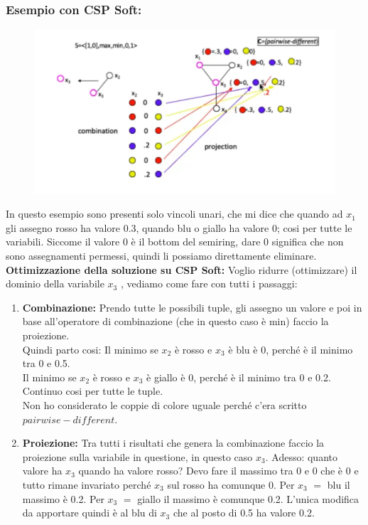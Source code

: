 \subsubsection{Esempio con CSP Soft:}
\begin{figure}[H]
    \centering
    \includegraphics[width=14cm, keepaspectratio]{img/Cap5/Local.png}
\end{figure}
\noindent In questo esempio sono presenti solo vincoli unari, che mi dice che
quando ad $x_1$ gli assegno rosso ha valore 0.3, quando blu o giallo ha valore
0; cosi per tutte le variabili. Siccome il valore 0 è il bottom del semiring,
dare 0 significa che non sono assegnamenti permessi, quindi li possiamo
direttamente eliminare.\\
\textbf{Ottimizzazione della soluzione su CSP Soft: } Voglio ridurre
(ottimizzare) il dominio della variabile $x_3$ , vediamo come fare con tutti i
passaggi:
\begin{enumerate}
    \item \textbf{Combinazione:} Prendo tutte le possibili tuple, gli assegno un
          valore e poi in base all'operatore di combinazione (che in questo caso
          è min) faccio la proiezione. \\Quindi parto cosi: Il minimo se $x_2$ è
          rosso e $x_3$ è blu è 0, perché è il minimo tra 0 e 0.5. \\Il minimo
          se $x_2$ è rosso e $x_3$ è giallo è 0, perché è il minimo tra 0 e 0.2.
          \\Continuo cosi per tutte le tuple. \\Non ho considerato le coppie di
          colore uguale perché c'era scritto $pairwise-different$.
    \item \textbf{Proiezione:} Tra tutti i risultati che genera la combinazione
          faccio la proiezione sulla variabile in questione, in questo caso $x_3$.
          Adesso: quanto valore ha $x_3$ quando ha valore rosso? Devo fare il massimo
          tra 0 e 0 che è 0 e tutto rimane invariato perché $x_3$ sul rosso ha
          comunque 0. Per $x_3$ $=$ blu il massimo è 0.2. Per $x_3$ $=$ giallo il
          massimo è comunque 0.2. L'unica modifica da apportare quindi è al blu di $x_3$
          che al posto di 0.5 ha valore 0.2.
\end{enumerate}
